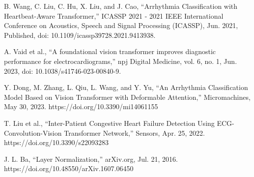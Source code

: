 \documentclass[conference]{IEEEtran}
\begin{document}
\begin{thebibliography}{00}
 B. Wang, C. Liu, C. Hu, X. Liu, and J. Cao, “Arrhythmia Classification with Heartbeat-Aware Transformer,” ICASSP 2021 - 2021 IEEE International Conference on Acoustics, Speech and Signal Processing (ICASSP), Jun. 2021, Published, doi: 10.1109/icassp39728.2021.9413938.

 A. Vaid et al., “A foundational vision transformer improves diagnostic performance for electrocardiograms,” npj Digital Medicine, vol. 6, no. 1, Jun. 2023, doi: 10.1038/s41746-023-00840-9.

 Y. Dong, M. Zhang, L. Qiu, L. Wang, and Y. Yu, “An Arrhythmia Classification Model Based on Vision Transformer with Deformable Attention,” Micromachines, May 30, 2023. https://doi.org/10.3390/mi14061155 

 T. Liu et al., “Inter-Patient Congestive Heart Failure Detection Using ECG-Convolution-Vision Transformer Network,” Sensors, Apr. 25, 2022. https://doi.org/10.3390/s22093283  

 J. L. Ba, “Layer Normalization,” arXiv.org, Jul. 21, 2016. https://doi.org/10.48550/arXiv.1607.06450 

\end{thebibliography}




\end{document}
